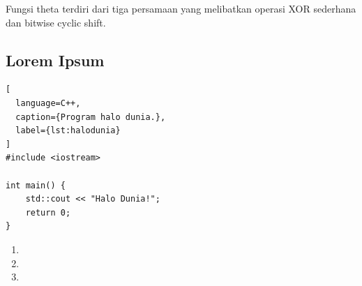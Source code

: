 Fungsi theta terdiri dari tiga persamaan yang melibatkan operasi XOR sederhana dan bitwise cyclic shift.





\subsection{Lorem Ipsum}
\label{subsec:loremipsum}

\lipsum[11]


\begin{lstlisting}[
  language=C++,
  caption={Program halo dunia.},
  label={lst:halodunia}
]
#include <iostream>

int main() {
    std::cout << "Halo Dunia!";
    return 0;
}
\end{lstlisting}

\lipsum[12]

\begin{enumerate}
  \item \lipsum[13][1-4]
  \item \lipsum[13][5-8]
  \item \lipsum[13][9-12]
\end{enumerate}

\lipsum[14-15]
